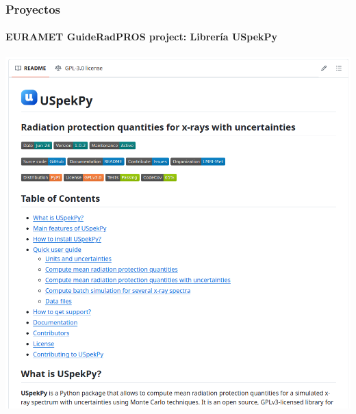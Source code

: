 \documentclass{beamer}
\begin{document}
	\begin{frame}
		\frametitle{Proyectos}
		\framesubtitle{EURAMET GuideRadPROS project: Librería USpekPy}
		\centering
		\includegraphics[width=\textwidth]{GRP_uspekpy}
	\end{frame}
	
\end{document}
